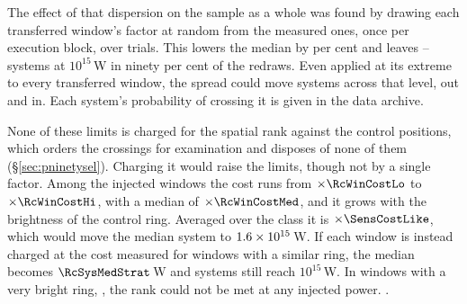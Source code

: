 The effect of that dispersion on the sample as a whole was found by drawing
each transferred window's factor at random from the measured ones, once per
execution block, over \SvNTrial{} trials. This lowers the median by
\SvRsMedShiftPct{} per cent and leaves \SvRsBlkNLo--\SvRsBlkNHi{} systems at
$10^{15}$\,W in ninety per cent of the redraws. Even applied at its extreme to every
transferred window, the spread could move \SvSprN{} systems across that
level, \SvSprNOut{} out and \SvSprNIn{} in. Each system's probability of
crossing it is given in the data archive.

None of these limits is charged for the spatial rank against the \NCtrl{}
control positions, which orders the crossings for examination and disposes
of none of them (\S\ref{sec:pninetysel}). Charging it would raise the
limits, though not by a single factor. Among the injected windows the cost
runs from $\times\RcWinCostLo$ to $\times\RcWinCostHi$, with a median of
$\times\RcWinCostMed$, and it grows with the brightness of the control ring.
Averaged over the class it is $\times\SensCostLike$, which would move the
median system to $1.6\times10^{15}$\,W. If each window is instead
charged at the cost measured for windows with a similar ring, the median
becomes $\RcSysMedStrat$\,W and \RcNSysEfifteenStrat{} systems still reach
$10^{15}$\,W. In \SensNRingHiUnres{} windows with a very bright ring,
\RcNoRankWins, the rank could not be met at any injected power.
\RcNoRankSysClause.

